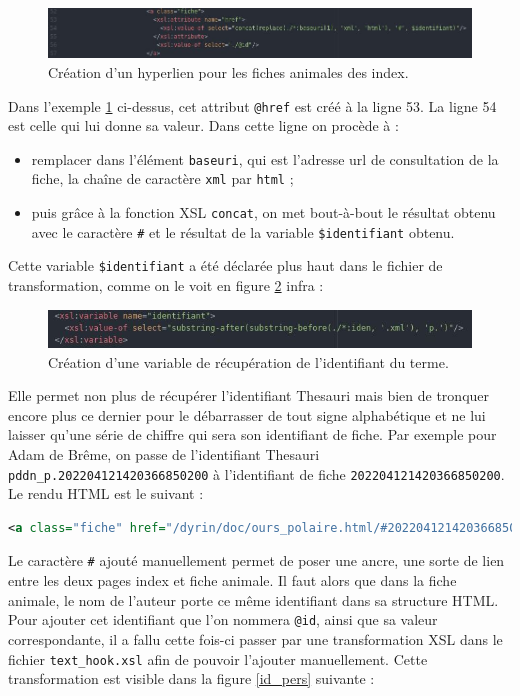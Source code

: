 \documentclass[a4paper,12pt,twoside]{book}
\begin{document}
\begin{figure}[H]
    \centering
    \includegraphics[width=\linewidth]{img/partie_3/href_breme.JPG}
    \caption{Création d'un hyperlien pour les fiches animales des index.}
    \label{href_breme}
\end{figure}

Dans l'exemple \ref{href_breme} ci-dessus, cet attribut \texttt{@href} est créé à la ligne 53. La ligne 54 est celle qui lui donne sa valeur. Dans cette ligne on procède à :
\begin{itemize}
    \item remplacer dans l'élément \texttt{baseuri}, qui est l'adresse url de consultation de la fiche, la chaîne de caractère \texttt{xml} par \texttt{html} ; 
    \item puis grâce à la fonction \acrshort{XSL} \texttt{concat}, on met bout-à-bout le résultat obtenu avec le caractère \texttt{\#} et le résultat de la variable \texttt{\$identifiant} obtenu.
\end{itemize}


Cette variable \texttt{\$identifiant} a été déclarée plus haut dans le fichier de transformation, comme on le voit en figure \ref{variable} infra :

\begin{figure}[H]
    \centering
    \includegraphics[width=12cm]{img/partie_3/variable_xsl.JPG}
    \caption{Création d'une variable de récupération de l'identifiant du terme.}
    \label{variable}
\end{figure}

Elle permet non plus de récupérer l'identifiant Thesauri mais bien de tronquer encore plus ce dernier pour le débarrasser de tout signe alphabétique et ne lui laisser qu'une série de chiffre qui sera son identifiant de fiche. Par exemple pour Adam de Brême, on passe de l'identifiant Thesauri \texttt{ pddn\_p.202204121420366850200} à l'identifiant de fiche \texttt{202204121420366850200}. Le rendu \acrshort{HTML} est le suivant : 
\begin{lstlisting}[language=XML]
<a class="fiche" href="/dyrin/doc/ours_polaire.html/#202204121420366850200">ours polaire</a>
\end{lstlisting}
Le caractère \texttt{\#} ajouté manuellement permet de poser une ancre, une sorte de lien entre les deux pages index et fiche animale. Il faut alors que dans la fiche animale, le nom de l'auteur porte ce même identifiant dans sa structure \acrshort{HTML}. Pour ajouter cet identifiant que l'on nommera \texttt{@id}, ainsi que sa valeur correspondante, il a fallu cette fois-ci passer par une transformation \acrshort{XSL} dans le fichier \texttt{text\_hook.xsl} afin de pouvoir l'ajouter manuellement. Cette transformation est visible dans la figure \ref{id_pers} suivante :
\end{document}

